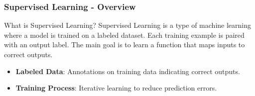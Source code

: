\documentclass[aspectratio=169]{beamer}
\begin{document}
\begin{frame}[fragile]
    \frametitle{Supervised Learning - Overview}
    
    \begin{block}{What is Supervised Learning?}
        Supervised Learning is a type of machine learning where a model is trained on a labeled dataset. Each training example is paired with an output label. The main goal is to learn a function that maps inputs to correct outputs.
    \end{block}

    \begin{itemize}
        \item \textbf{Labeled Data}: Annotations on training data indicating correct outputs.
        \item \textbf{Training Process}: Iterative learning to reduce prediction errors.
    \end{itemize}
\end{frame}
\end{document}
